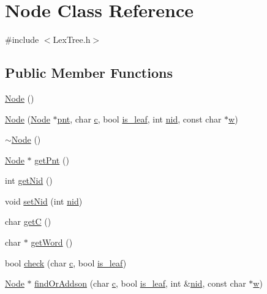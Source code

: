 \hypertarget{class_node}{\section{Node Class Reference}
\label{class_node}
}


{\ttfamily \#include $<$Lex\+Tree.\+h$>$}

\subsection*{Public Member Functions}
\begin{DoxyCompactItemize}
\item 
\hyperlink{class_node_ad7a34779cad45d997bfd6d3d8043c75f}{Node} ()
\item 
\hyperlink{class_node_a42f0be41a8d33d92cd580a6a88772dca}{Node} (\hyperlink{class_node}{Node} $\ast$\hyperlink{class_node_a205e65c58cfc162fa74ffcf9e887471f}{pnt}, char \hyperlink{class_node_a61aff5c2aea5a34a609ffcbdb88fde6f}{c}, bool \hyperlink{class_node_a3e5449ec9e41ba98cbaf8f3a993d03c4}{is\+\_\+leaf}, int \hyperlink{class_node_a7282da2b6b3eebdb62b36d416c68b8f4}{nid}, const char $\ast$\hyperlink{deltas_8m_aad57484016654da87125db86f4227ea3}{w})
\item 
\hyperlink{class_node_aa0840c3cb5c7159be6d992adecd2097c}{$\sim$\+Node} ()
\item 
\hyperlink{class_node}{Node} $\ast$ \hyperlink{class_node_a214db49ba82743d8775c0990a978e231}{get\+Pnt} ()
\item 
int \hyperlink{class_node_adab1be3a3df5b32d16887a1f51dcb123}{get\+Nid} ()
\item 
void \hyperlink{class_node_af78ede99de1283f5d7a584d04433c955}{set\+Nid} (int \hyperlink{class_node_a7282da2b6b3eebdb62b36d416c68b8f4}{nid})
\item 
char \hyperlink{class_node_a6a44543e572bf2e12fb1470876e71463}{get\+C} ()
\item 
char $\ast$ \hyperlink{class_node_a181e1914c3a80f896bcde8134338775f}{get\+Word} ()
\item 
bool \hyperlink{class_node_aa5f99e27253924aba6775f522b23e42b}{check} (char \hyperlink{class_node_a61aff5c2aea5a34a609ffcbdb88fde6f}{c}, bool \hyperlink{class_node_a3e5449ec9e41ba98cbaf8f3a993d03c4}{is\+\_\+leaf})
\item 
\hyperlink{class_node}{Node} $\ast$ \hyperlink{class_node_a6bfc60c5d7a39a5fc67e583c5142ee3b}{find\+Or\+Addson} (char \hyperlink{class_node_a61aff5c2aea5a34a609ffcbdb88fde6f}{c}, bool \hyperlink{class_node_a3e5449ec9e41ba98cbaf8f3a993d03c4}{is\+\_\+leaf}, int \&\hyperlink{class_node_a7282da2b6b3eebdb62b36d416c68b8f4}{nid}, const char $\ast$\hyperlink{deltas_8m_aad57484016654da87125db86f4227ea3}{w})

\end{DoxyCompactItemize}
